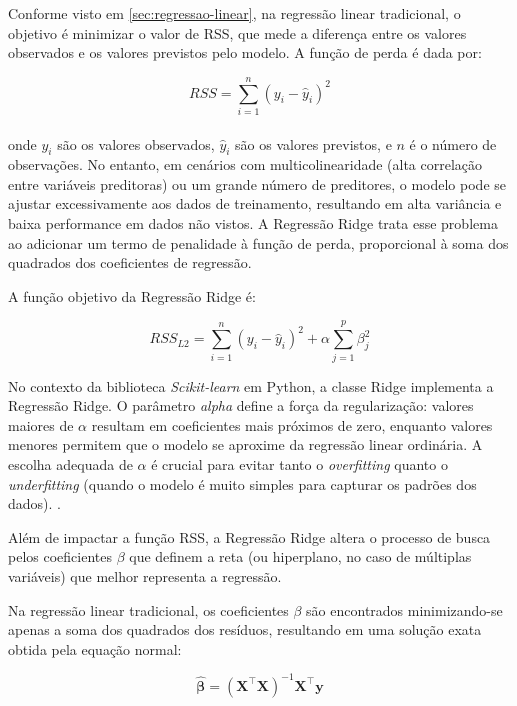 Conforme visto em \ref{sec:regressao-linear}, na regressão linear tradicional, o objetivo é minimizar o valor de \gls{RSS}, que mede a diferença entre os valores observados e os valores previstos pelo modelo. A função de perda é dada por:

\begin{equation}
	RSS = \sum_{i=1}^{n} (y_i - \hat{y}_i)^2
\end{equation}
\\

\noindent onde $y_i$ são os valores observados, $\hat{y}_i$ são os valores previstos, e $n$ é o número de observações. No entanto, em cenários com multicolinearidade (alta correlação entre variáveis preditoras) ou um grande número de preditores, o modelo pode se ajustar excessivamente aos dados de treinamento, resultando em alta variância e baixa performance em dados não vistos. A Regressão Ridge trata esse problema ao adicionar um termo de penalidade à função de perda, proporcional à soma dos quadrados dos coeficientes de regressão. 

A função objetivo da Regressão Ridge é:

\begin{equation}
	RSS_{L2} = \sum_{i=1}^{n} (y_i - \hat{y}_i)^2 + \alpha \sum_{j=1}^{p} \beta_j^2
\end{equation}

No contexto da biblioteca \textit{Scikit-learn} em Python, a classe Ridge implementa a Regressão Ridge. O parâmetro \textit{alpha} define a força da regularização: valores maiores de $\alpha$ resultam em coeficientes mais próximos de zero, enquanto valores menores permitem que o modelo se aproxime da regressão linear ordinária. A escolha adequada de 
$\alpha$ é crucial para evitar tanto o \textit{overfitting} quanto o \textit{underfitting} (quando o modelo é muito simples para capturar os padrões dos dados). \cite{ScikitLearnRidge2025}.

Além de impactar a função RSS, a Regressão Ridge altera o processo de busca pelos coeficientes $\beta$ que definem a reta (ou hiperplano, no caso de múltiplas variáveis) que melhor representa a regressão.

Na regressão linear tradicional, os coeficientes $\beta$ são encontrados minimizando-se apenas a soma dos quadrados dos resíduos, resultando em uma solução exata obtida pela equação normal:

\begin{equation}
	\hat{\boldsymbol\beta} = (\mathbf{X}^\top \mathbf{X})^{-1} \mathbf{X}^\top \mathbf{y}
\end{equation}

